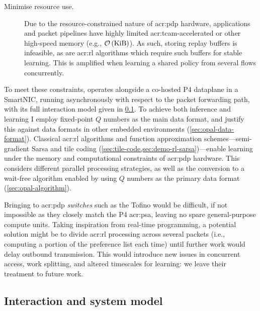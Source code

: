 \begin{description}
	\item[Minimise resource use.] Due to the resource-constrained nature of \gls{acr:pdp} hardware, applications and packet pipelines have highly limited \gls{acr:tcam}-accelerated or other high-speed memory (e.g., $\mathcal{O}\left(\unit{\kibi\byte}\right)$). As such, storing replay buffers is infeasible, as are \gls{acr:rl} algorithms which require such buffers for stable learning. This is amplified when learning a shared policy from several flows concurrently.
	
%	
\end{description}

To meet these constraints, \approachshort{} operates alongside a co-hosted P4 dataplane in a SmartNIC, running asynchronously with respect to the packet forwarding path, with its full interaction model given in \cref{sec:opal-sys-model}.
To achieve both inference and learning I employ fixed-point $Q$ numbers as the main data format, and justify this against data formats in other embedded environments (\cref{sec:opal-data-format}).
Classical \gls{acr:rl} algorithms and function approximation schemes---semi-gradient Sarsa and tile coding (\cref{sec:tile-code,sec:demo-rl-sarsa})---enable learning under the memory and computational constraints of \gls{acr:pdp} hardware. This considers different parallel processing strategies, as well as the conversion to a wait-free algorithm enabled by using $Q$ numbers as the primary data format (\cref{sec:opal-algorithm}).

Bringing \approachshort{} to \gls{acr:pdp} \emph{switches} such as the Tofino would be difficult, if not impossible as they closely match the P4 \gls{acr:psa}, leaving no spare general-purpose compute units.
Taking inspiration from real-time programming, a potential solution might be to divide \gls{acr:rl} processing across several packets (i.e., computing a portion of the preference list each time) until further work would delay outbound transmission.
This would introduce new issues in concurrent access, work splitting, and altered timescales for learning: we leave their treatment to future work.

\subsection{Interaction and system model}\label{sec:opal-sys-model}

